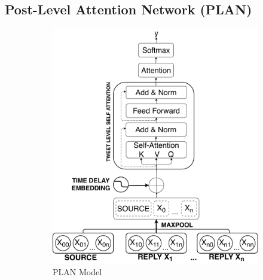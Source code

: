 \documentclass[letterpaper]{article} %
\begin{document}
\subsection{Post-Level Attention Network (PLAN)}
\label{sec:plan}

\begin{figure}
\centering
\begin{subfigure}{0.4\columnwidth}
\centering
\includegraphics[width=\columnwidth]{PLAN_model.pdf}
\caption{PLAN Model}
\label{fig:plan}
\end{subfigure}
~
\begin{subfigure}{0.5\columnwidth}
\centering

\end{subfigure}
\end{figure}
\end{document}
